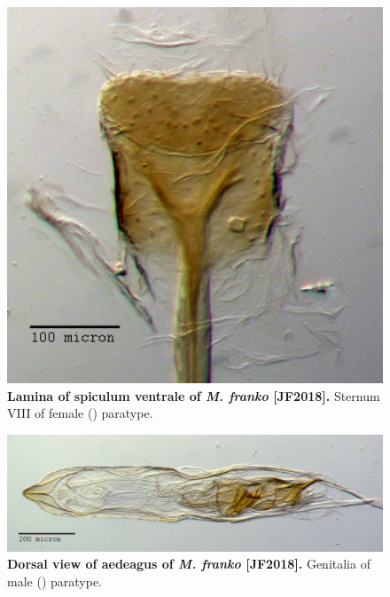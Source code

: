 \documentclass[fleqn,10pt,lineno]{wlpeerj} %
\begin{document}
\begin{figure}[h]
	\centering
	\includegraphics[width=\textwidth]{franko_lamina.jpg}
	\caption{\textbf{Lamina of spiculum ventrale of \textit{M. franko} [JF2018].} Sternum VIII of female (\female) paratype.}
	\label{fig:franko_lamina}
\end{figure}

\begin{figure}[h]
	\centering
	\begin{sideways}
		\includegraphics[width=0.95\textheight]{franko_aedeagus_dorsal.jpg}
	\end{sideways}
	\caption{\textbf{Dorsal view of aedeagus of \textit{M. franko} [JF2018].} Genitalia of male (\male) paratype.}
	\label{fig:franko_aedeagus_dorsal}
\end{figure}
\end{document}
